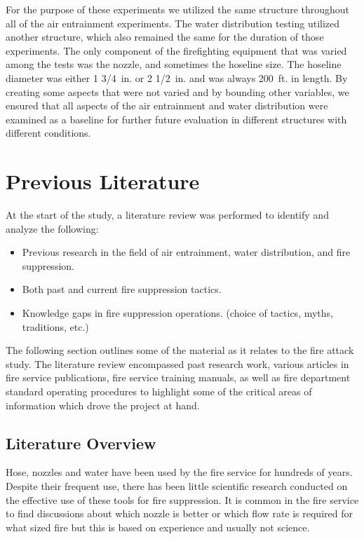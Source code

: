 \documentclass{article}
\begin{document}
For the purpose of these experiments we utilized the same structure throughout all of the air entrainment experiments. The water distribution testing utilized another structure, which also remained the same for the duration of those experiments. The only component of the firefighting equipment that was varied among the tests was the nozzle, and sometimes the hoseline size. The hoseline diameter was either 1 3/4~in. or 2 1/2~in. and was always 200~ft. in length. By creating some aspects that were not varied and by bounding other variables, we ensured that all aspects of the air entrainment and water distribution were examined as a baseline for further future evaluation in different structures with different conditions.

\clearpage

\section{Previous Literature}

At the start of the study, a literature review was performed to identify and analyze the following:

\begin{itemize}
	\item Previous research in the field of air entrainment, water distribution, and fire suppression.
	\item Both past and current fire suppression tactics.
	\item Knowledge gaps in fire suppression operations. (choice of tactics, myths, traditions, etc.) 
\end{itemize}

The following section outlines some of the material as it relates to the fire attack study. The literature review encompassed past research work, various articles in fire service publications, fire service training manuals, as well as fire department standard operating procedures to highlight some of the critical areas of information which drove the project at hand.

\subsection{Literature Overview}

Hose, nozzles and water have been used by the fire service for hundreds of years. Despite their frequent use, there has been little scientific research conducted on the effective use of these tools for fire suppression. It is common in the fire service to find discussions about which nozzle is better or which flow rate is required for what sized fire but this is based on experience and usually not science. 
\end{document}
